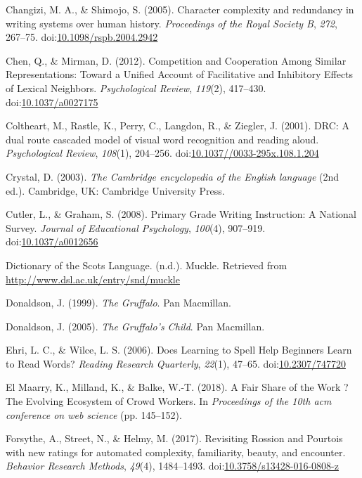 \documentclass[doc,floatsintext]{apa6}
\begin{document}
\hypertarget{ref-Changizi2005}{}
Changizi, M. A., \& Shimojo, S. (2005). Character complexity and
redundancy in writing systems over human history. \emph{Proceedings of
the Royal Society B}, \emph{272}, 267--75.
doi:\href{https://doi.org/10.1098/rspb.2004.2942}{10.1098/rspb.2004.2942}

\hypertarget{ref-Chen2012}{}
Chen, Q., \& Mirman, D. (2012). Competition and Cooperation Among
Similar Representations: Toward a Unified Account of Facilitative and
Inhibitory Effects of Lexical Neighbors. \emph{Psychological Review},
\emph{119}(2), 417--430.
doi:\href{https://doi.org/10.1037/a0027175}{10.1037/a0027175}

\hypertarget{ref-Coltheart2001}{}
Coltheart, M., Rastle, K., Perry, C., Langdon, R., \& Ziegler, J.
(2001). DRC: A dual route cascaded model of visual word recognition and
reading aloud. \emph{Psychological Review}, \emph{108}(1), 204--256.
doi:\href{https://doi.org/10.1037//0033-295x.108.1.204}{10.1037//0033-295x.108.1.204}

\hypertarget{ref-Crystal2003}{}
Crystal, D. (2003). \emph{The Cambridge encyclopedia of the English
language} (2nd ed.). Cambridge, UK: Cambridge University Press.

\hypertarget{ref-Cutler2008}{}
Cutler, L., \& Graham, S. (2008). Primary Grade Writing Instruction: A
National Survey. \emph{Journal of Educational Psychology},
\emph{100}(4), 907--919.
doi:\href{https://doi.org/10.1037/a0012656}{10.1037/a0012656}

\hypertarget{ref-DictionaryoftheScotsLanguage}{}
Dictionary of the Scots Language. (n.d.). Muckle. Retrieved from
\url{http://www.dsl.ac.uk/entry/snd/muckle}

\hypertarget{ref-Donaldson1999}{}
Donaldson, J. (1999). \emph{The Gruffalo}. Pan Macmillan.

\hypertarget{ref-Donaldson2005}{}
Donaldson, J. (2005). \emph{The Gruffalo's Child}. Pan Macmillan.

\hypertarget{ref-Ehri2006}{}
Ehri, L. C., \& Wilce, L. S. (2006). Does Learning to Spell Help
Beginners Learn to Read Words? \emph{Reading Research Quarterly},
\emph{22}(1), 47--65.
doi:\href{https://doi.org/10.2307/747720}{10.2307/747720}

\hypertarget{ref-ElMaarry2018}{}
El Maarry, K., Milland, K., \& Balke, W.-T. (2018). A Fair Share of the
Work ? The Evolving Ecosystem of Crowd Workers. In \emph{Proceedings of
the 10th acm conference on web science} (pp. 145--152).

\hypertarget{ref-Forsythe2017}{}
Forsythe, A., Street, N., \& Helmy, M. (2017). Revisiting Rossion and
Pourtois with new ratings for automated complexity, familiarity, beauty,
and encounter. \emph{Behavior Research Methods}, \emph{49}(4),
1484--1493.
doi:\href{https://doi.org/10.3758/s13428-016-0808-z}{10.3758/s13428-016-0808-z}
\end{document}
